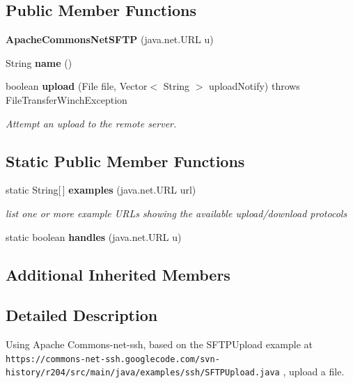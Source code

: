 \subsection*{Public Member Functions}
\begin{DoxyCompactItemize}
\item 
{\bfseries Apache\+Commons\+Net\+S\+F\+T\+P} (java.\+net.\+U\+R\+L u)\label{classorg_1_1smallfoot_1_1filexfer_1_1ApacheCommonsNetSFTP_a67d38a2fe0500ee93a9613fc011497b4}

\item 
String {\bfseries name} ()\label{classorg_1_1smallfoot_1_1filexfer_1_1ApacheCommonsNetSFTP_afa2149aced9d90555f788dfc81c23d15}

\item 
boolean {\bf upload} (File file, Vector$<$ String $>$ upload\+Notify)  throws File\+Transfer\+Winch\+Exception     
\begin{DoxyCompactList}\small\item\em Attempt an upload to the remote server. \end{DoxyCompactList}\end{DoxyCompactItemize}
\subsection*{Static Public Member Functions}
\begin{DoxyCompactItemize}
\item 
static String[$\,$] {\bf examples} (java.\+net.\+U\+R\+L url)
\begin{DoxyCompactList}\small\item\em list one or more example U\+R\+Ls showing the available upload/download protocols \end{DoxyCompactList}\item 
static boolean {\bfseries handles} (java.\+net.\+U\+R\+L u)\label{classorg_1_1smallfoot_1_1filexfer_1_1ApacheCommonsNetSFTP_a4ef8d35ab128080eb511f7e26cd7ab7b}

\end{DoxyCompactItemize}
\subsection*{Additional Inherited Members}


\subsection{Detailed Description}
Using Apache Commons-\/net-\/ssh, based on the S\+F\+T\+P\+Upload example at {\tt https\+://commons-\/net-\/ssh.\+googlecode.\+com/svn-\/history/r204/src/main/java/examples/ssh/\+S\+F\+T\+P\+Upload.\+java} , upload a file. 

